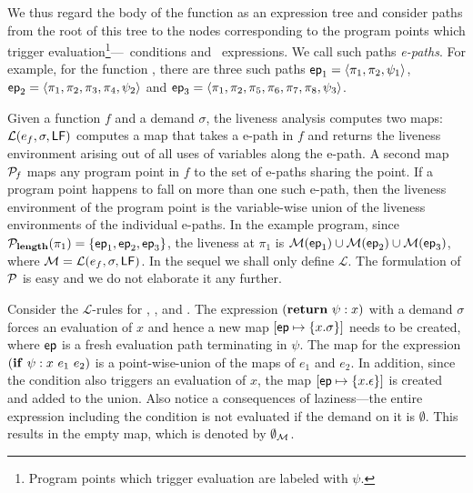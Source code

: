 \documentclass[9pt]{sigplanconf}
\begin{document}
We thus  regard the  body of  the function as  an expression  tree and
consider paths from  the root of this tree to  the nodes corresponding
to the program points which trigger evaluation\footnote{Program points
  which      trigger      evaluation       are      labeled      with
  $\psi$.}---\SIF\ conditions and \SRETURN\ expressions.  We call such
paths {\em e-paths}.  For example, for the function \length, there are
three  such paths  $\mathsf{ep}_1 =  \langle \pi_1,  \pi_2, \psi_1\rangle$,
$\mathsf{ep}_2  = \langle\pi_1,  \pi_2,  \pi_3,  \pi_4, \psi_2\rangle$  and
$\mathsf{ep}_3  =  \langle  \pi_1,   \pi_2,  \pi_5,  \pi_6,  \pi_7,  \pi_8,
\psi_3\rangle$.

Given  a function  $\mathit{f}$ and  a demand  $\sigma$,  the liveness
analysis  computes  two   maps:  $\mathcal{L}(e_f,  \sigma,  \mathsf{LF})$
computes a  map that takes a  e-path in ${\mathit f}$  and returns the
liveness environment  arising out of  all uses of variables  along the
e-path.  A second map $\cal{P}_{\mathit  f}$ maps any program point in
$\mathit f$  to the set  of e-paths sharing  the point.  If  a program
point happens to fall on more  than one such e-path, then the liveness
environment of  the program  point is the  variable-wise union  of the
liveness  environments  of the  individual  e-paths.   In the  example
program,  since ${\mathcal P}_{\mathbf{length}}(\pi_1)  = \lbrace  \mathsf{ep}_1, \mathsf{ep}_2,
\mathsf{ep}_3\rbrace$, the  liveness at $\pi_1$  is ${\cal M}(\mathsf{ep}_1)  \cup {\cal
  M}(\mathsf{ep}_2) \cup  {\cal M}(\mathsf{ep}_3)$,  where ${\cal M}  = \mathcal{L}(e_f,
\sigma, \mathsf{LF})$.  In the  sequel we shall only define $\mathcal{L}$.
The formulation  of $\cal{P}$ is easy  and we do not  elaborate it any
further.

Consider the  $\mathcal{L}$-rules for {\LET}, {\SIF},  and {\SRETURN}.
The expression  $(\mbox{$\mathbf{ return}$}~\psi:x)$ with  a demand $\sigma$  forces an
evaluation  of  $x$ and  hence  a  new map  $[\mathit{\mathsf{ep}}  \mapsto
  \{x.\sigma\}]  $ needs  to be  created,  where $\mathsf{ep}$  is a  fresh
evaluation path  terminating in  $\psi$.  The  map for  the expression
$(\mbox{$\mathbf{ if}$}~\psi:x~e_1~e_2)$ is a point-wise-union of  the maps of $e_1$ and
$e_2$. In addition, since the condition also triggers an evaluation of
$x$, the map $[\mathit{\mathsf{ep}} \mapsto \{x.\epsilon\}]$ is created and
added  to the  union.  Also  notice a  consequences of  laziness---the
entire  expression including  the condition  is not  evaluated if  the
demand on it is $\emptyset$.  This  results in the empty map, which is
denoted by $\emptyset_{\cal{M}}$.
\end{document}
